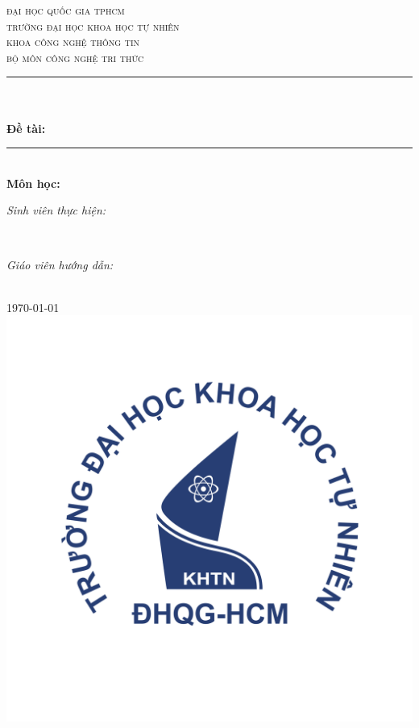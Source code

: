 \begin{titlepage}
    \newcommand{\HRule}{\rule{\linewidth}{0.5mm}}
    \centering

    \textsc{\LARGE đại học quốc gia tphcm}\\[0.5cm]
    \textsc{\Large trường đại học khoa học tự nhiên}\\[0.5cm]
    \textsc{\large khoa công nghệ thông tin}\\[0.5cm]
    \textsc{bộ môn công nghệ tri thức}\\[0.5cm]

    \HRule{}\\[0.4cm]
    {
    \huge{\bfseries{\reporttitle}}\\[0.5cm]
    \large{\bfseries{Đề tài: \reportname}}
    }\\[0.4cm]
    \HRule{}\\[0.5cm]

    \textbf{\large Môn học: \coursename}\\[0.5cm]

    \begin{minipage}[t]{0.4\textwidth}
        \begin{flushleft} \large
            \emph{Sinh viên thực hiện:}\\
            \studentname{}
        \end{flushleft}
    \end{minipage}
    {~}
    \begin{minipage}[t]{0.4\textwidth}
        \begin{flushright} \large
            \emph{Giáo viên hướng dẫn:} \\
            \teachername{}
        \end{flushright}
    \end{minipage}\\[1cm]

    {\large \today}\\[1cm]

    \includegraphics[scale=.20]{img/hcmus-logo.png}\\[1cm]

    \vfill
\end{titlepage}
